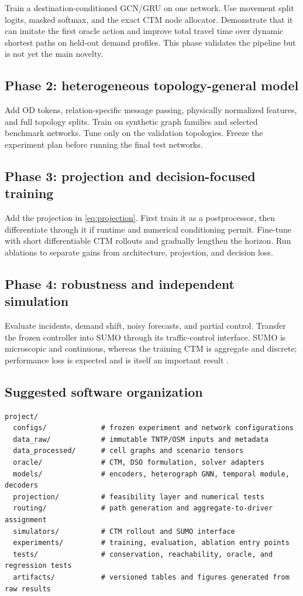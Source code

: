 \documentclass[11pt]{article}
\begin{document}
Train a destination-conditioned GCN/GRU on one network.  Use movement split logits,
masked softmax, and the exact CTM node allocator.  Demonstrate that it can imitate the
first oracle action and improve total travel time over dynamic shortest paths on held-out
demand profiles.  This phase validates the pipeline but is not yet the main novelty.

\subsection{Phase 2: heterogeneous topology-general model}

Add OD tokens, relation-specific message passing, physically normalized features, and
full topology splits.  Train on synthetic graph families and selected benchmark
networks.  Tune only on the validation topologies.  Freeze the experiment plan before
running the final test networks.

\subsection{Phase 3: projection and decision-focused training}

Add the projection in \cref{eq:projection}.  First train it as a postprocessor, then
differentiate through it if runtime and numerical conditioning permit.  Fine-tune with
short differentiable CTM rollouts and gradually lengthen the horizon.  Run ablations to
separate gains from architecture, projection, and decision loss.

\subsection{Phase 4: robustness and independent simulation}

Evaluate incidents, demand shift, noisy forecasts, and partial control.  Transfer the
frozen controller into SUMO through its traffic-control interface.  SUMO is microscopic
and continuous, whereas the training CTM is aggregate and discrete; performance loss is
expected and is itself an important result \citep{lopez2018}.

\subsection{Suggested software organization}

\begin{verbatim}
project/
  configs/             # frozen experiment and network configurations
  data_raw/            # immutable TNTP/OSM inputs and metadata
  data_processed/      # cell graphs and scenario tensors
  oracle/              # CTM, DSO formulation, solver adapters
  models/              # encoders, heterograph GNN, temporal module, decoders
  projection/          # feasibility layer and numerical tests
  routing/             # path generation and aggregate-to-driver assignment
  simulators/          # CTM rollout and SUMO interface
  experiments/         # training, evaluation, ablation entry points
  tests/               # conservation, reachability, oracle, and regression tests
  artifacts/           # versioned tables and figures generated from raw results
\end{verbatim}
\end{document}
